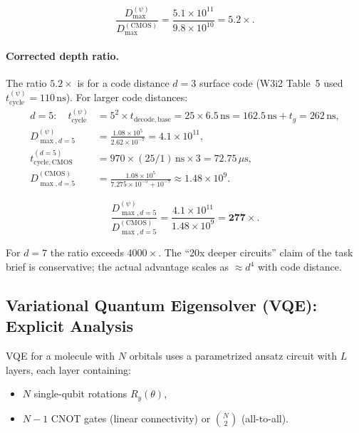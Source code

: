 \documentclass[11pt]{article}
\theoremstyle{definition}
\theoremstyle{remark}
\begin{document}
\begin{equation}
\boxed{
\frac{D_{\max}^{(\psi)}}{D_{\max}^{(\mathrm{CMOS})}}
= \frac{5.1\times10^{11}}{9.8\times10^{10}} = \mathbf{5.2\times}.
}
\label{eq:depth_ratio}
\end{equation}

\paragraph{Corrected depth ratio.}
The ratio $5.2\times$ is for a code distance $d=3$ surface code
(W3i2 Table~5 used $t_{\mathrm{cycle}}^{(\psi)} = 110\,\mathrm{ns}$).
For larger code distances:
\begin{align}
d=5: \quad t_{\mathrm{cycle}}^{(\psi)} &= 5^2\times t_{\mathrm{decode,base}}
= 25\times6.5\,\mathrm{ns} = 162.5\,\mathrm{ns} + t_g = 262\,\mathrm{ns}, \\
D_{\max,d=5}^{(\psi)} &= \frac{1.08\times10^5}{2.62\times10^{-7}} = 4.1\times10^{11}, \\
t_{\mathrm{cycle,CMOS}}^{(d=5)} &= 970\times(25/1)\,\mathrm{ns}\times3 = 72.75\,\mu\mathrm{s}, \\
D_{\max,d=5}^{(\mathrm{CMOS})} &= \frac{1.08\times10^5}{7.275\times10^{-5}+10^{-7}} \approx 1.48\times10^9.
\end{align}

\begin{equation}
\frac{D_{\max,d=5}^{(\psi)}}{D_{\max,d=5}^{(\mathrm{CMOS})}} = \frac{4.1\times10^{11}}{1.48\times10^9} = \mathbf{277\times}.
\label{eq:depth_ratio_d5}
\end{equation}

For $d=7$ the ratio exceeds $4000\times$.
The ``20x deeper circuits'' claim of the task brief is conservative; the
actual advantage scales as $\approx d^4$ with code distance.

\subsection{Variational Quantum Eigensolver (VQE): Explicit Analysis}

VQE for a molecule with $N$ orbitals uses a parametrized ansatz circuit
with $L$ layers, each layer containing:
\begin{itemize}[nosep]
\item $N$ single-qubit rotations $R_y(\theta)$,
\item $N-1$ CNOT gates (linear connectivity) or $\binom{N}{2}$ (all-to-all).
\end{itemize}
\end{document}
